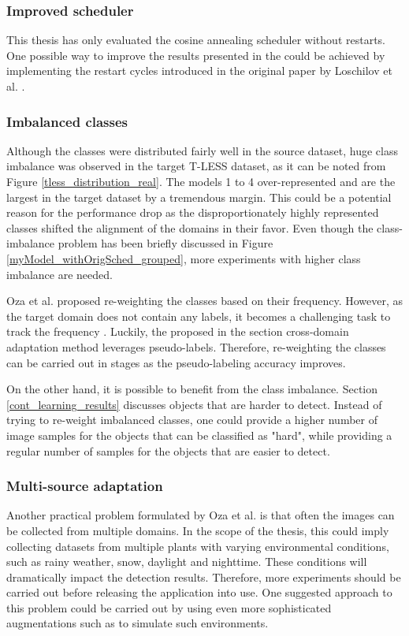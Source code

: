 \subsubsection{Improved scheduler}
This thesis has only evaluated the cosine annealing scheduler without restarts. One possible way to improve the results presented in the  could be achieved by implementing the restart cycles introduced in the original paper by Loschilov et al. \cite{Loshchilov2016}.   


\subsubsection{Imbalanced classes}
Although the classes were distributed fairly well in the source dataset, huge class imbalance was observed in the target T-LESS dataset, as it can be noted from Figure \ref{tless_distribution_real}. The models 1 to 4 over-represented and are the largest in the target dataset by a tremendous margin. This could be a potential reason for the performance drop as the disproportionately highly represented classes shifted the alignment of the domains in their favor. Even though the class-imbalance problem has been briefly discussed in Figure \ref{myModel_withOrigSched_grouped}, more experiments with higher class imbalance are needed.

Oza et al. proposed re-weighting the classes based on their frequency. However, as the target domain does not contain any labels, it becomes a challenging task to track the frequency \cite{Oza2021}. Luckily, the proposed in the  section cross-domain adaptation method leverages pseudo-labels. Therefore, re-weighting the classes can be carried out in stages as the pseudo-labeling accuracy improves. 

On the other hand, it is possible to benefit from the class imbalance. Section \ref{cont_learning_results} discusses objects that are harder to detect. Instead of trying to re-weight imbalanced classes, one could provide a higher number of image samples for the objects that can be classified as "hard", while providing a regular number of samples for the objects that are easier to detect.

\subsubsection{Multi-source adaptation}
Another practical problem formulated by Oza et al. \cite{Oza2021} is that often the images can be collected from multiple domains. In the scope of the thesis, this could imply collecting datasets from multiple plants with varying environmental conditions, such as rainy weather, snow, daylight and nighttime. These conditions will dramatically impact the detection results. Therefore, more experiments should be carried out before releasing the application into use. One suggested approach to this problem could be carried out by using even more sophisticated augmentations such as \cite{imgaug} to simulate such environments. 



